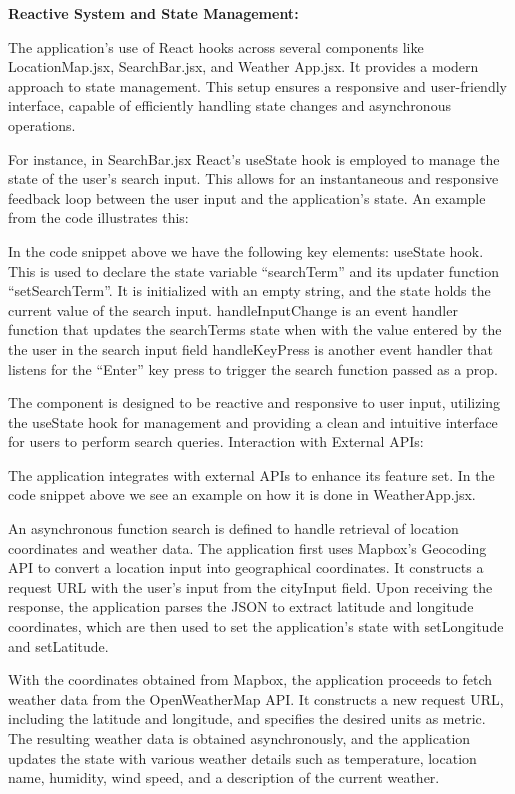 \textbf{Reactive System and State Management:}

The application's use of React hooks across several components like LocationMap.jsx, SearchBar.jsx, and Weather App.jsx. It provides a modern approach to state management. This setup ensures a responsive and user-friendly interface, capable of efficiently handling state changes and asynchronous operations.

For instance, in SearchBar.jsx React's useState  hook is employed to manage the state of the user's search input. This allows for an instantaneous and responsive feedback loop between the user input and the application's state. An example from the code illustrates this:




In the code snippet above we have the following key elements: 
useState hook. This is used to declare the state variable “searchTerm” and its updater function “setSearchTerm”. It is initialized with an empty string, and the state holds the current value of the search input. 
handleInputChange is an event handler function that updates the searchTerms state when with the value entered by the the user in the search input field
handleKeyPress is another event handler that listens for the “Enter” key press to trigger the search function passed as a prop. 

The component is designed to be reactive and responsive to user input, utilizing the useState hook for management and providing a clean and intuitive interface for users to perform search queries. 
Interaction with External APIs:

 

The application integrates with external APIs to enhance its feature set. In the code snippet above we see an example on how it is done in WeatherApp.jsx.

An asynchronous function search is defined to handle retrieval of location coordinates and weather data. The application first uses Mapbox's Geocoding API to convert a location input into geographical coordinates. It constructs a request URL with the user's input from the cityInput field. Upon receiving the response, the application parses the JSON to extract latitude and longitude coordinates, which are then used to set the application's state with setLongitude and setLatitude.

With the coordinates obtained from Mapbox, the application proceeds to fetch weather data from the OpenWeatherMap API. It constructs a new request URL, including the latitude and longitude, and specifies the desired units as metric. The resulting weather data is obtained asynchronously, and the application updates the state with various weather details such as temperature, location name, humidity, wind speed, and a description of the current weather.

